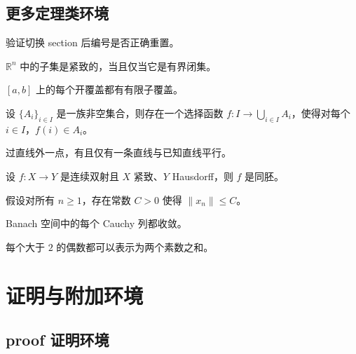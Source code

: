 \documentclass[12pt,a4paper]{ctexbook}
\begin{document}
\section{更多定理类环境}

验证切换 section 后编号是否正确重置。

\begin{theorem}
$\mathbb{R}^n$ 中的子集是紧致的，当且仅当它是有界闭集。
\end{theorem}

\begin{corollary}[有限覆盖]
$[a,b]$ 上的每个开覆盖都有有限子覆盖。
\end{corollary}

\begin{axiom}
设 $\{A_i\}_{i\in I}$ 是一族非空集合，则存在一个选择函数
$f\colon I\to\bigcup_{i\in I}A_i$，使得对每个 $i\in I$，$f(i)\in A_i$。
\end{axiom}

\begin{postulate}[欧几里得第五公设]
过直线外一点，有且仅有一条直线与已知直线平行。
\end{postulate}

\begin{proposition}[开映射性质]
设 $f\colon X\to Y$ 是连续双射且 $X$ 紧致、$Y$ Hausdorff，则 $f$ 是同胚。
\end{proposition}

\begin{assumption}[有界性假设]
假设对所有 $n\geq1$，存在常数 $C>0$ 使得 $\|x_n\|\leq C$。
\end{assumption}

\begin{property}
Banach 空间中的每个 Cauchy 列都收敛。
\end{property}

\begin{conjecture}[Goldbach 猜想]
每个大于 $2$ 的偶数都可以表示为两个素数之和。
\end{conjecture}

\chapter{证明与附加环境}

\section{proof 证明环境}
\end{document}
